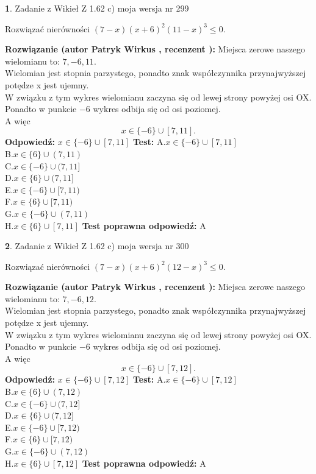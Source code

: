 \documentclass[12pt, a4paper]{article}
\theoremstyle{definition} %
\newtheorem{zad}{}
\newcommand{\zadStart}[1]{\begin{zad}#1\newline}
\newcommand{\zadStop}{\end{zad}}
\newcommand{\rozwStart}[2]{\noindent \textbf{Rozwiązanie (autor #1 , recenzent #2): }\newline}
\newcommand{\rozwStop}{\newline}
\newcommand{\odpStart}{\noindent \textbf{Odpowiedź:}\newline}
\newcommand{\odpStop}{\newline}
\newcommand{\testStart}{\noindent \textbf{Test:}\newline}
\newcommand{\testStop}{\newline}
\newcommand{\kluczStart}{\noindent \textbf{Test poprawna odpowiedź:}\newline}
\newcommand{\kluczStop}{\newline}
\begin{document}
\zadStart{Zadanie z Wikieł Z 1.62 c) moja wersja nr 299}

Rozwiązać nierówności $(7-x)(x+6)^{2}(11-x)^{3}\le0$.
\zadStop
\rozwStart{Patryk Wirkus}{}
Miejsca zerowe naszego wielomianu to: $7, -6, 11$.\\
Wielomian jest stopnia parzystego, ponadto znak współczynnika przy\linebreak najwyższej potędze x jest ujemny.\\ W związku z tym wykres wielomianu zaczyna się od lewej strony powyżej osi OX.\\
Ponadto w punkcie $-6$ wykres odbija się od osi poziomej.\\
A więc $$x \in \{-6\} \cup [7,11].$$
\rozwStop
\odpStart
$x \in \{-6\} \cup [7,11]$
\odpStop
\testStart
A.$x \in \{-6\} \cup [7,11]$\\
B.$x \in \{6\} \cup (7,11)$\\
C.$x \in \{-6\} \cup (7,11]$\\
D.$x \in \{6\} \cup (7,11]$\\
E.$x \in \{-6\} \cup [7,11)$\\
F.$x \in \{6\} \cup [7,11)$\\
G.$x \in \{-6\} \cup (7,11)$\\
H.$x \in \{6\} \cup [7,11]$
\testStop
\kluczStart
A
\kluczStop



\zadStart{Zadanie z Wikieł Z 1.62 c) moja wersja nr 300}

Rozwiązać nierówności $(7-x)(x+6)^{2}(12-x)^{3}\le0$.
\zadStop
\rozwStart{Patryk Wirkus}{}
Miejsca zerowe naszego wielomianu to: $7, -6, 12$.\\
Wielomian jest stopnia parzystego, ponadto znak współczynnika przy\linebreak najwyższej potędze x jest ujemny.\\ W związku z tym wykres wielomianu zaczyna się od lewej strony powyżej osi OX.\\
Ponadto w punkcie $-6$ wykres odbija się od osi poziomej.\\
A więc $$x \in \{-6\} \cup [7,12].$$
\rozwStop
\odpStart
$x \in \{-6\} \cup [7,12]$
\odpStop
\testStart
A.$x \in \{-6\} \cup [7,12]$\\
B.$x \in \{6\} \cup (7,12)$\\
C.$x \in \{-6\} \cup (7,12]$\\
D.$x \in \{6\} \cup (7,12]$\\
E.$x \in \{-6\} \cup [7,12)$\\
F.$x \in \{6\} \cup [7,12)$\\
G.$x \in \{-6\} \cup (7,12)$\\
H.$x \in \{6\} \cup [7,12]$
\testStop
\kluczStart
A
\kluczStop
\end{document}
